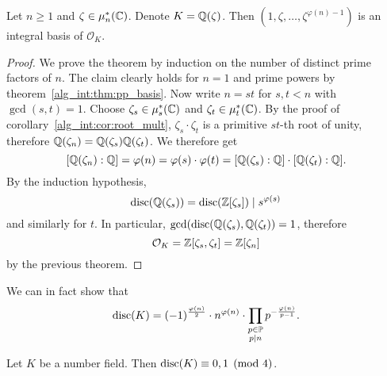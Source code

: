 \begin{izrek}
Let $n \geq 1$ and $\zeta \in \mu_n^*(\mathbb{C})$. Denote $K = \mathbb{Q}(\zeta)$.
Then $(1, \zeta, \dots, \zeta^{\varphi(n)-1})$ is an integral
basis of $\mathcal{O}_K$.
\end{izrek}

\begin{proof}
We prove the theorem by induction on the number of distinct prime
factors of $n$. The claim clearly holds for $n=1$ and prime powers
by theorem~\ref{alg_int:thm:pp_basis}. Now write $n=st$ for
$s, t < n$ with $\gcd(s,t) = 1$. Choose $\zeta_s \in \mu_s^*(\mathbb{C})$
and $\zeta_t \in \mu_t^*(\mathbb{C})$. By the proof of
corollary~\ref{alg_int:cor:root_mult}, $\zeta_s \cdot \zeta_t$ is
a primitive $st$-th root of unity, therefore
$\mathbb{Q}(\zeta_n) = \mathbb{Q}(\zeta_s) \mathbb{Q}(\zeta_t)$. We therefore get
\[
[\mathbb{Q}(\zeta_n) : \mathbb{Q}] =
\varphi(n) =
\varphi(s) \cdot \varphi(t) =
[\mathbb{Q}(\zeta_s) : \mathbb{Q}] \cdot [\mathbb{Q}(\zeta_t) : \mathbb{Q}].
\]
By the induction hypothesis,
\[
\operatorname{disc}(\mathbb{Q}(\zeta_s)) = \operatorname{disc}(\mathbb{Z}[\zeta_s]) \mid s^{\varphi(s)}
\]
and similarly for $t$. In particular,
$\gcd(\operatorname{disc}(\mathbb{Q}(\zeta_s), \mathbb{Q}(\zeta_t)) = 1$, therefore
\[
\mathcal{O}_K = \mathbb{Z}[\zeta_s, \zeta_t] = \mathbb{Z}[\zeta_n]
\]
by the previous theorem.
\end{proof}

\begin{opomba}
We can in fact show that
\[
\operatorname{disc}(K) =
(-1)^{\frac{\varphi(n)}{2}} \cdot n^{\varphi(n)} \cdot
\prod_{\substack{p \in \mathbb{P} \\ p \mid n}}
p^{-\frac{\varphi(n)}{p-1}}.
\]
\end{opomba}

\begin{izrek}[Stickelberger]
Let $K$ be a number field. Then $\operatorname{disc}(K) \equiv 0, 1 \pmod{4}$.
\end{izrek}

